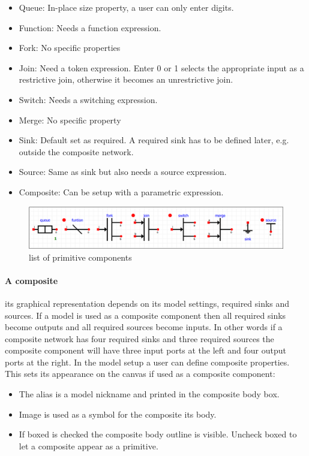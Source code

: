 \begin{itemize}
\item Queue: In-place size property, a user can only enter digits.
\item Function: Needs a function expression.
\item Fork: No specific properties
\item Join: Need a token expression. Enter 0 or 1 selects the appropriate
input as a restrictive join, otherwise it becomes an unrestrictive join.
\item Switch: Needs a switching expression.
\item Merge: No specific property
\item Sink: Default set as required. A required sink has to be defined later, e.g. outside the composite network.
\item Source: Same as sink but also needs a source expression.
\item Composite: Can be setup with a parametric expression.
\end{itemize}

\begin{figure}[here]
\begin{center}	
	\includegraphics[width=.70\linewidth]{pictures/primitives}
	\caption{list of primitive components}
	\label{fig:primitives}
\end{center}
\end{figure}

\paragraph{A composite} \label{sec:composite} its graphical representation
depends on its model settings, required sinks and sources. If a model is used as
a composite component then all required sinks become outputs and all required
sources become inputs. In other words if a composite network has four required
sinks and three required sources the composite component will have three input
ports at the left and four output ports at the right. In the model setup a user
can define composite properties. This sets its appearance on the canvas if
used as a composite component:
\begin{itemize}
\item The alias is a model nickname and printed in the composite body box.
\item Image is used as a symbol for the composite its body. 
\item If boxed is checked the composite body outline is visible.
Uncheck boxed to let a composite appear as a primitive.
\end{itemize}

